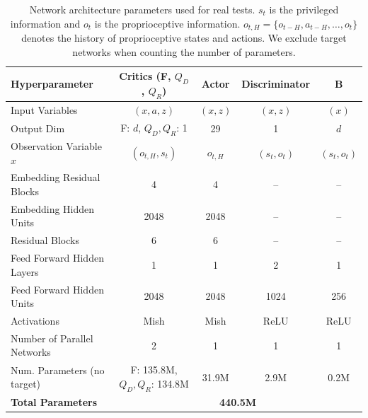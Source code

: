\begin{table}[htbp]
    \centering
    \footnotesize
    \begin{tabular}{lcccc}
        \toprule
        \textbf{Hyperparameter} & \textbf{Critics (F, $Q_D$, $Q_R$)} & \textbf{Actor} & \textbf{Discriminator} & \textbf{B} \\
        \midrule
        Input Variables                & $(x, a, z)$ & $(x, z)$ & $(x, z)$ & $(x)$ \\
        Output Dim                     & F: $d$, $Q_D, Q_R$: 1 & 29 & 1 & $d$ \\
        Observation Variable $x$       & $(o_{t,H}, s_t)$ & $o_{t,H}$ & $(s_t, o_t)$ & $(s_t, o_t)$ \\
        Embedding Residual Blocks      & 4 & 4 & – & – \\
        Embedding Hidden Units         & 2048 & 2048 & – & – \\
        Residual Blocks                & 6 & 6 & – & – \\
        Feed Forward Hidden Layers     & 1 & 1 & 2 & 1 \\
        Feed Forward Hidden Units      & 2048 & 2048 & 1024 & 256 \\
        Activations                    & Mish & Mish & ReLU & ReLU \\
        Number of Parallel Networks    & 2 & 1 & 1 & 1 \\
        \midrule
        Num. Parameters (no target)    & F: 135.8M, $Q_D, Q_R$: 134.8M & 31.9M & 2.9M & 0.2M \\
        \midrule
        \textbf{Total Parameters}      & \multicolumn{4}{c}{\textbf{440.5M}} \\
        \bottomrule
    \end{tabular}
    \caption{Network architecture parameters used for real tests. $s_t$ is the privileged information and $o_t$ is the proprioceptive information. $o_{t,H} = \{o_{t-H}, a_{t-H}, \ldots, o_t\}$ denotes the history of proprioceptive states and actions. We exclude target networks when counting the number of parameters.}
    \label{tab:archi}
\end{table}

